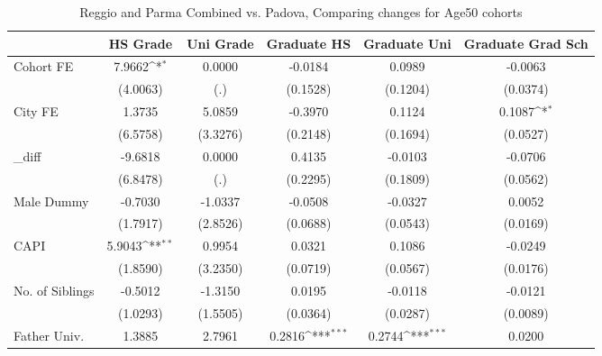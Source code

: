 \begin{table}[htbp]\centering
\def\sym#1{\ifmmode^{#1}\else\(^{#1}\)\fi}
\caption{Reggio and Parma Combined vs. Padova, Comparing changes for Age50 cohorts}
\begin{tabular}{l*{5}{c}}
\toprule
            &\multicolumn{1}{c}{HS Grade}&\multicolumn{1}{c}{Uni Grade}&\multicolumn{1}{c}{Graduate HS}&\multicolumn{1}{c}{Graduate Uni}&\multicolumn{1}{c}{Graduate Grad Sch}\\
\midrule
Cohort FE   &      7.9662\sym{*}  &      0.0000         &     -0.0184         &      0.0989         &     -0.0063         \\
            &    (4.0063)         &         (.)         &    (0.1528)         &    (0.1204)         &    (0.0374)         \\
\addlinespace
City FE     &      1.3735         &      5.0859         &     -0.3970         &      0.1124         &      0.1087\sym{*}  \\
            &    (6.5758)         &    (3.3276)         &    (0.2148)         &    (0.1694)         &    (0.0527)         \\
\addlinespace
\_diff       &     -9.6818         &      0.0000         &      0.4135         &     -0.0103         &     -0.0706         \\
            &    (6.8478)         &         (.)         &    (0.2295)         &    (0.1809)         &    (0.0562)         \\
\addlinespace
Male Dummy  &     -0.7030         &     -1.0337         &     -0.0508         &     -0.0327         &      0.0052         \\
            &    (1.7917)         &    (2.8526)         &    (0.0688)         &    (0.0543)         &    (0.0169)         \\
\addlinespace
CAPI        &      5.9043\sym{**} &      0.9954         &      0.0321         &      0.1086         &     -0.0249         \\
            &    (1.8590)         &    (3.2350)         &    (0.0719)         &    (0.0567)         &    (0.0176)         \\
\addlinespace
No. of Siblings&     -0.5012         &     -1.3150         &      0.0195         &     -0.0118         &     -0.0121         \\
            &    (1.0293)         &    (1.5505)         &    (0.0364)         &    (0.0287)         &    (0.0089)         \\
\addlinespace
Father Univ.&      1.3885         &      2.7961         &      0.2816\sym{***}&      0.2744\sym{***}&      0.0200         \\

\end{tabular}
\end{table}
